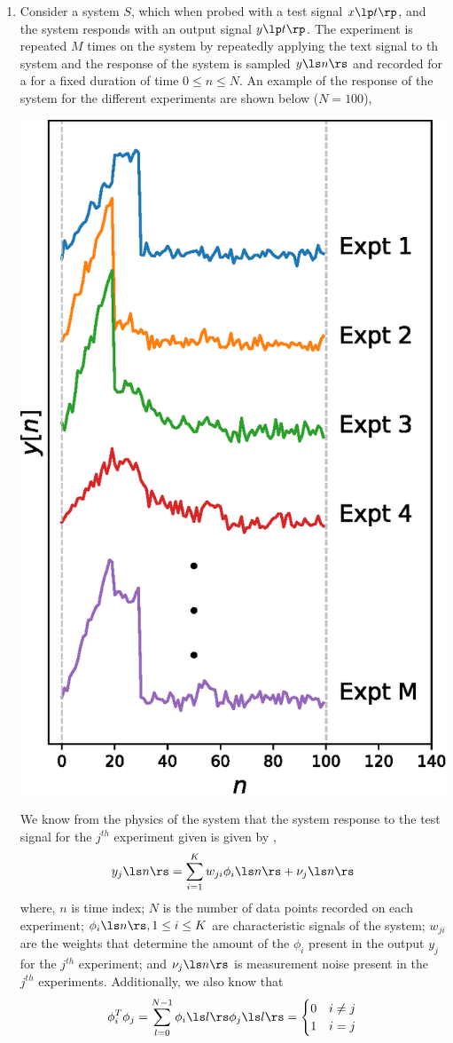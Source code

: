 \begin{enumerate}[resume]
    \item Consider a system  $S$, which when probed with a test signal $x\lp  t\rp$, and the system responds with an output signal $y\lp t\rp$. The experiment is repeated $M$ times on the system by repeatedly applying the text signal to th system and the response of the system is sampled $y\ls n\rs$ and recorded for a for a fixed duration of time $0 \leq n \leq N$. An example of the response of the system for the different experiments are shown below ($N = 100$),\vspace{-0.25cm}
    \begin{center}
    \includegraphics[width=0.7\columnwidth]{sections/figs/trig_expt.eps}
    \end{center}\vspace{-0.3cm}
    We know from the physics of the system that the system response to the test signal for the $j^{th}$ experiment given is given by ,
    \[ y_j\ls n \rs = \sum_{i=1}^{K} w_{ji}\phi_i\ls n\rs + \nu_j\ls n\rs\]
    where, $n$ is time index; $N$ is the number of data points recorded on each experiment; $\phi_i\ls n\rs, 1 \leq i \leq K$ are characteristic signals of the system; $w_{ji}$ are the weights that determine the amount of the $\phi_i$ present in the output $y_j$ for the $j^{th}$ experiment; and $\nu_j\ls n\rs$ is measurement noise present in the $j^{th}$ experiments. Additionally, we also know that
    $$ \phi_i^T\phi_j = \sum_{l=0}^{N-1} \phi_i\ls l \rs\phi_j\ls l\rs = \begin{cases} 0 & i \neq j \\ 1 & i = j \end{cases} $$


\end{enumerate}
